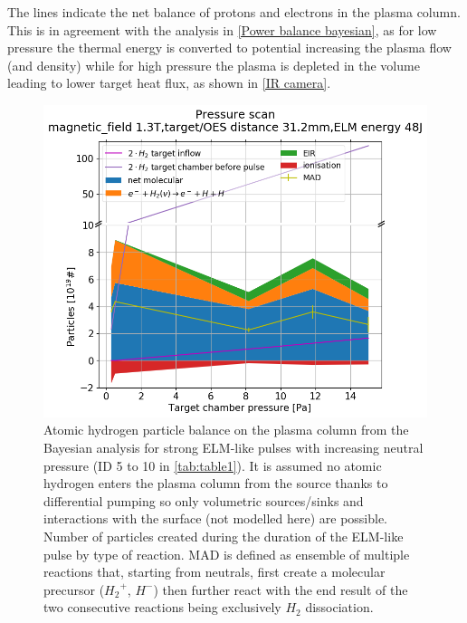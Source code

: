 The lines indicate the net balance of protons and electrons in the plasma column. This is in agreement with the analysis in \autoref{Power balance bayesian}, as for low pressure the thermal energy is converted to potential increasing the plasma flow (and density) while for high pressure the plasma is depleted in the volume leading to lower target heat flux, as shown in \autoref{IR camera}.

\begin{figure}
        \centering
    	\includegraphics[width=0.7\linewidth,trim={35 5 60 50},clip]{Chapters/chapter3/figs/Bayesian_strong_7.png}
	\caption{Atomic hydrogen particle balance on the plasma column from the Bayesian analysis for strong ELM-like pulses with increasing neutral pressure (ID 5 to 10 in \autoref{tab:table1}). It is assumed no atomic hydrogen enters the plasma column from the source thanks to differential pumping so only volumetric sources/sinks and interactions with the surface (not modelled here) are possible. Number of particles created during the duration of the ELM-like pulse by type of reaction. MAD is defined as ensemble of multiple reactions that, starting from neutrals, first create a molecular precursor (${H_2}^+$, $H^-$) then further react with the end result of the two consecutive reactions being exclusively $H_2$ dissociation.\cite{Verhaegh2020}}
	\label{fig:bayes4}
\end{figure}

